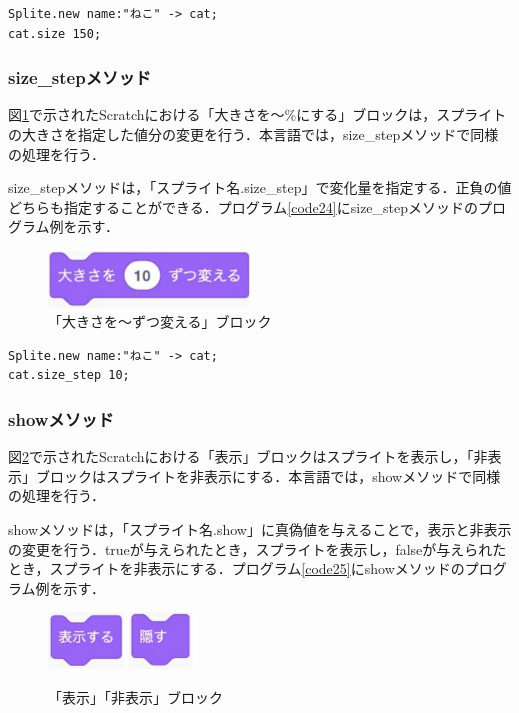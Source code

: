 \documentclass[10pt,a4j]{ltjsarticle}
\begin{document}
\begin{lstlisting}[caption=sizeメソッドのプログラム例, label=code23]
Splite.new name:"ねこ" -> cat;
cat.size 150;
\end{lstlisting}

\subsubsection{size\_stepメソッド}
図\ref{fig:size_step}で示されたScratchにおける「大きさを〜\%にする」ブロックは，スプライトの大きさを指定した値分の変更を行う．本言語では，size\_stepメソッドで同様の処理を行う．

size\_stepメソッドは，「スプライト名.size\_step」で変化量を指定する．正負の値どちらも指定することができる．プログラム\ref{code24}にsize\_stepメソッドのプログラム例を示す．

\begin{figure}[H]
  \centering
  \includegraphics[height=15mm]{images/size_step.pdf}
  \caption{「大きさを〜ずつ変える」ブロック}
  \label{fig:size_step}
\end{figure}

\begin{lstlisting}[caption=size\_stepメソッドのプログラム例, label=code24]
Splite.new name:"ねこ" -> cat;
cat.size_step 10;
\end{lstlisting}

\subsubsection{showメソッド}
図\ref{fig:show}で示されたScratchにおける「表示」ブロックはスプライトを表示し，「非表示」ブロックはスプライトを非表示にする．本言語では，showメソッドで同様の処理を行う．

showメソッドは，「スプライト名.show」に真偽値を与えることで，表示と非表示の変更を行う．trueが与えられたとき，スプライトを表示し，falseが与えられたとき，スプライトを非表示にする．プログラム\ref{code25}にshowメソッドのプログラム例を示す．

\begin{figure}[H]
  \centering
  \includegraphics[height=15mm]{images/show.pdf} 
  \includegraphics[height=15mm]{images/hide.pdf}
  \caption{「表示」「非表示」ブロック}
  \label{fig:show}
\end{figure}
\end{document}
